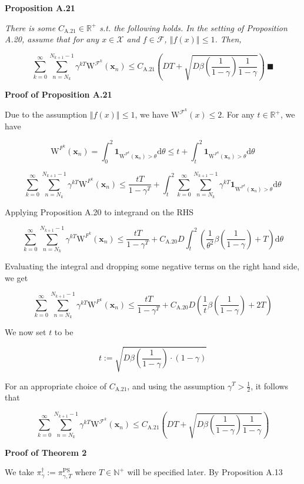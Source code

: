 \documentclass[a4paper]{article}
\newcommand{\Co}[1]{}
\newcommand{\AP}[1]{\left(#1\right)}
\newcommand{\Norm}[1]{\left\Vert #1 \right\Vert}
\newcommand{\Nats}{\mathbb{N}}
\newcommand{\Reals}{\mathbb{R}}
\newcommand{\D}{\mathrm{d}} %
\newcommand{\X}{\mathcal{X}}
\newcommand{\PSR}{\text{PS}}
\newcommand{\F}{\mathcal{F}}
\newcommand{\W}{\mathrm{W}}
\begin{document}
\textbf{Proposition A.21}\Co{b}

\textit{There is some $C_{\mathrm{A.21}}\in\Reals^+$ s.t. the following holds. In the setting of Proposition A.20, assume that for any $x\in\X$ and $f\in\F$, $\Norm{f(x)}\leq1$. Then,}\Co{i}

$$\sum_{k=0}^{\infty}\sum_{n=N_k}^{N_{k+1}-1}\gamma^{kT}\W^{\F^k}\AP{\boldsymbol{x}_{n}} \leq C_{\text{A.21}}\AP{DT+\sqrt{D\beta\AP{\frac{1}{1-\gamma}}\frac{1}{1-\gamma}}}\ \blacksquare$$

\textbf{Proof of Proposition A.21}\Co{b}

Due to the assumption $\Norm{f(x)}\leq1$, we have $\W^{\F^k}(x)\leq 2$. For any $t\in\Reals^+$, we have

$$\W^{F^k}\AP{\boldsymbol{x}_{n}}=\int_0^2\boldsymbol{1}_{\W^{F^k}\AP{\boldsymbol{x}_{n}}>\theta}\D\theta\leq t+\int_t^2\boldsymbol{1}_{\W^{F^k}\AP{\boldsymbol{x}_{n}}>\theta}\D\theta$$

$$\sum_{k=0}^\infty\sum_{n=N_k}^{N_{k+1}-1}{\gamma^{kT}\W^{F^k}\AP{\boldsymbol{x}_{n}}}\leq\frac{tT}{1-\gamma^{T}}+\int_t^2 \sum_{k=0}^\infty\sum_{n=N_k}^{N_{k+1}-1}\gamma^{kT}\boldsymbol{1}_{\W^{F^k}\AP{\boldsymbol{x}_{n}}>\theta}\D\theta$$

Applying Proposition A.20 to integrand on the RHS

$$\sum_{k=0}^\infty\sum_{n=N_k}^{N_{k+1}-1}{\gamma^{kT}\W^{F^k}\AP{\boldsymbol{x}_{n}}}\leq\frac{tT}{1-\gamma^{T}}+C_{\text{A.20}}D\int_t^2\AP{\frac{1}{\theta^2}\beta\AP{\frac{1}{1-\gamma}}+T}\D\theta$$

Evaluating the integral and dropping some negative terms on the right hand side, we get

$$\sum_{k=0}^\infty\sum_{n=N_k}^{N_{k+1}-1}{\gamma^{kT}\W^{F^k}\AP{\boldsymbol{x}_{n}}}\leq\frac{tT}{1-\gamma^{T}}+C_{\text{A.20}}D \AP{\frac{1}{t}\beta\AP{\frac{1}{1-\gamma}}+2T}$$

We now set $t$ to be

$$t:=\sqrt{D\beta\AP{\frac{1}{1-\gamma}}\cdot(1-\gamma)}$$

For an appropriate choice of $C_{\text{A.21}}$, and using the assumption $\gamma^T>\frac{1}{2}$, it follows that

$$\sum_{k=0}^{\infty}\sum_{n=N_k}^{N_{k+1}-1}\gamma^{kT}\W^{\F^k}\AP{\boldsymbol{x}_{n}} \leq C_{\text{A.21}}\AP{DT+\sqrt{D\beta\AP{\frac{1}{1-\gamma}}\frac{1}{1-\gamma}}}$$

\textbf{Proof of Theorem 2}\Co{b}

We take $\pi^\dagger_\gamma:=\pi^\PSR_{\gamma,T}$ where $T\in\Nats^+$ will be specified later. By Proposition A.13
\end{document}
